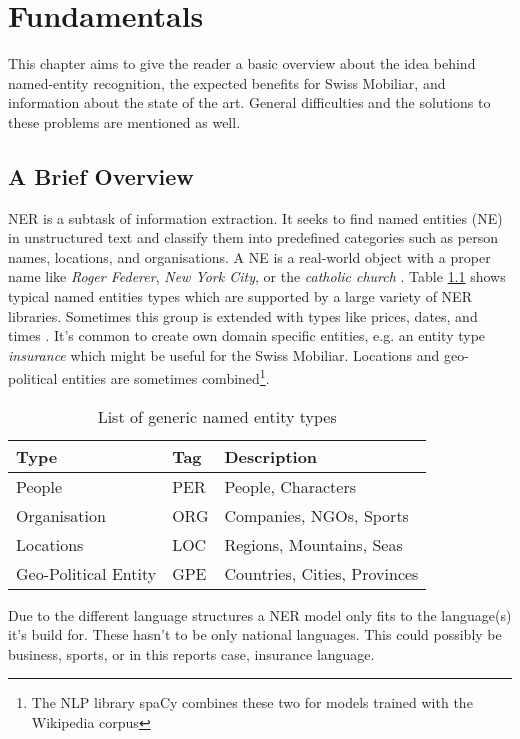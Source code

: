 \chapter{Fundamentals}
\label{chap:ner-overview}

This chapter aims to give the reader a basic overview about the idea behind named-entity recognition, the expected benefits for Swiss Mobiliar, and information about the state of the art. General difficulties and the solutions to these problems are mentioned as well.

\section{A Brief Overview}

NER is a subtask of information extraction. It seeks to find named entities (NE) in unstructured text and classify them into predefined categories such as person names, locations, and organisations. A NE is a real-world object with a proper name like \emph{Roger Federer}, \emph{New York City}, or the \emph{catholic church} \cite{wiki02}. Table \ref{tbl:named-entities} shows typical named entities types which are supported by a large variety of NER libraries. Sometimes this group is extended with types like prices, dates, and times \cite{Jurafsky2000}. It's common to create own domain specific entities, e.g. an entity type \emph{insurance} which might be useful for the Swiss Mobiliar. Locations and geo-political entities are sometimes combined\footnote{The NLP library spaCy combines these two for models trained with the Wikipedia corpus}.

\begin{table}[h!]
    \centering
    \begin{tabular}{|l|l|l|}
        \hline
        \textbf{Type} & \textbf{Tag} & \textbf{Description} \\ [0.5ex]
        \hline
        People & PER & People, Characters \\
        Organisation & ORG & Companies, NGOs, Sports \\
        Locations & LOC & Regions, Mountains, Seas \\
        Geo-Political Entity & GPE & Countries, Cities, Provinces \\ [1ex]
        \hline
    \end{tabular}
    \caption{List of generic named entity types}
    \label{tbl:named-entities}
\end{table}

Due to the different language structures a NER model only fits to the language(s) it's build for. These hasn't to be only national languages. This could possibly be business, sports, or in this reports case, insurance language.

